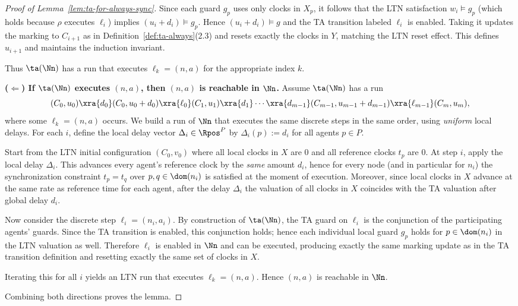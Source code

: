 \begin{proof}[Proof of Lemma~\ref{lem:ta-for-always-sync}]
Since each guard $g_p$ uses only clocks in $X_p$, it follows that
the LTN satisfaction $w_i\models g_p$ (which holds because $\rho$ executes
$\ell_i$) implies $(u_i+d_i)\models g_p$. Hence $(u_i+d_i)\models g$ and the TA
transition labeled $\ell_i$ is enabled. Taking it updates the marking to $C_{i+1}$
as in Definition~\ref{def:ta-always}(2.3) and resets exactly the clocks in $Y$,
matching the LTN reset effect. This defines $u_{i+1}$ and maintains the
induction invariant.

Thus $\ta(\Nn)$ has a run that executes $\ell_k=(n,a)$ for the appropriate index
$k$.

\medskip\noindent
\textbf{(\texorpdfstring{$\Leftarrow$}{<=}) If $\ta(\Nn)$ executes $(n,a)$, then $(n,a)$ is reachable in $\Nn$.}
Assume $\ta(\Nn)$ has a run
\[
(C_0,u_0)\xra{d_0}(C_0,u_0+d_0)\xra{\ell_0}(C_1,u_1)\xra{d_1}\cdots
\xra{d_{m-1}}(C_{m-1},u_{m-1}+d_{m-1})\xra{\ell_{m-1}}(C_m,u_m),
\]
where some $\ell_k=(n,a)$ occurs.
We build a run of $\Nn$ that executes the same discrete steps in the same order,
using \emph{uniform} local delays. For each $i$, define the local delay vector
$\Delta_i\in\Rpos^P$ by $\Delta_i(p):=d_i$ for all agents $p\in P$.

Start from the LTN initial configuration $(C_0,v_0)$ where all local clocks in
$X$ are $0$ and all reference clocks $t_p$ are $0$.
At step $i$, apply the local delay $\Delta_i$. This advances every agent's
reference clock by the \emph{same} amount $d_i$, hence for every node (and in
particular for $n_i$) the synchronization constraint $t_p=t_q$ over
$p,q\in\dom(n_i)$ is satisfied at the moment of execution.
Moreover, since local clocks in $X$ advance at the same rate as reference time
for each agent, after the delay $\Delta_i$ the valuation of all clocks in $X$
coincides with the TA valuation after global delay $d_i$.

Now consider the discrete step $\ell_i=(n_i,a_i)$. By construction of
$\ta(\Nn)$, the TA guard on $\ell_i$ is the conjunction of the participating
agents' guards. Since the TA transition is enabled, this conjunction holds; hence
each individual local guard $g_p$ holds for $p\in\dom(n_i)$ in the LTN valuation
as well. Therefore $\ell_i$ is enabled in $\Nn$ and can be executed, producing
exactly the same marking update as in the TA transition definition and resetting
exactly the same set of clocks in $X$.

Iterating this for all $i$ yields an LTN run that executes $\ell_k=(n,a)$.
Hence $(n,a)$ is reachable in $\Nn$.

\medskip
Combining both directions proves the lemma.
\end{proof}

